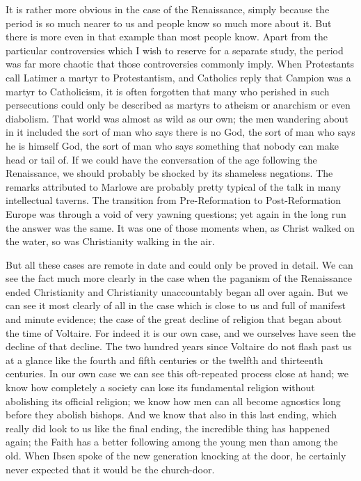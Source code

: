 It is rather more obvious in the case of the Renaissance, simply because the period is so much nearer to us and people know so much more about it. But there is more even in that example than most people know. Apart from the particular controversies which I wish to reserve for a separate study, the period was far more chaotic that those controversies commonly imply. When Protestants call Latimer a martyr to Protestantism, and Catholics reply that Campion was a martyr to Catholicism, it is often forgotten that many who perished in such persecutions could only be described as martyrs to atheism or anarchism or even diabolism. That world was almost as wild as our own; the men wandering about in it included the sort of man who says there is no God, the sort of man who says he is himself God, the sort of man who says something that nobody can make head or tail of. If we could have the conversation of the age following the Renaissance, we should probably be shocked by its shameless negations. The remarks attributed to Marlowe are probably pretty typical of the talk in many intellectual taverns. The transition from Pre-Reformation to Post-Reformation Europe was through a void of very yawning questions; yet again in the long run the answer was the same. It was one of those moments when, as Christ walked on the water, so was Christianity walking in the air.

But all these cases are remote in date and could only be proved in detail. We can see the fact much more clearly in the case when the paganism of the Renaissance ended Christianity and Christianity unaccountably began all over again. But we can see it most clearly of all in the case which is close to us and full of manifest and minute evidence; the case of the great decline of religion that began about the time of Voltaire. For indeed it is our own case, and we ourselves have seen the decline of that decline. The two hundred years since Voltaire do not flash past us at a glance like the fourth and fifth centuries or the twelfth and thirteenth centuries. In our own case we can see this oft-repeated process close at hand; we know how completely a society can lose its fundamental religion without abolishing its official religion; we know how men can all become agnostics long before they abolish bishops. And we know that also in this last ending, which really did look to us like the final ending, the incredible thing has happened again; the Faith has a better following among the young men than among the old. When Ibsen spoke of the new generation knocking at the door, he certainly never expected that it would be the church-door.

